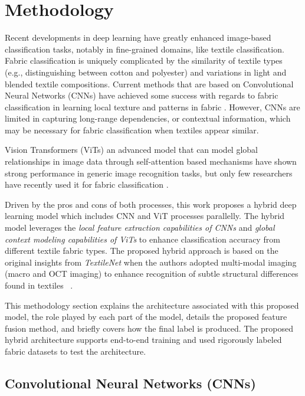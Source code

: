 \section{Methodology}

Recent developments in deep learning have greatly enhanced image-based classification tasks, notably in fine-grained domains, like textile classification. Fabric classification is uniquely complicated by the similarity of textile types (e.g., distinguishing between cotton and polyester) and variations in light and blended textile compositions. Current methods that are based on Convolutional Neural Networks (CNNs) have achieved some success with regards to fabric classification in learning local texture and patterns in fabric \cite{hong2024research, kampouris2016fine}. However, CNNs are limited in capturing long-range dependencies, or contextual information, which may be necessary for fabric classification when textiles appear similar. 

Vision Transformers (ViTs) an advanced model that can model global relationships in image data through self-attention based mechanisms \cite{dosovitskiy2020vit} have shown strong performance in generic image recognition tasks, but only few researchers have recently used it for fabric classification \cite{chitra2023fabric}. 

Driven by the pros and cons of both processes, this work proposes a hybrid deep learning model which includes CNN and ViT processes parallelly. The hybrid model leverages the \textit{local feature extraction capabilities of CNNs} and \textit{global context modeling capabilities of ViTs} to enhance classification accuracy from different textile fabric types. The proposed hybrid approach is based on the original insights from \textit{TextileNet} when the authors adopted multi-modal imaging (macro and OCT imaging) to enhance recognition of subtle structural differences found in textiles ~\cite{siam2023textilenet}.

This methodology section explains the architecture associated with this proposed model, the role played by each part of the model, details the proposed feature fusion method, and briefly covers how the final label is produced. The proposed hybrid architecture supports end-to-end training and used rigorously labeled fabric datasets to test the architecture.

\subsection{Convolutional Neural Networks (CNNs)}


